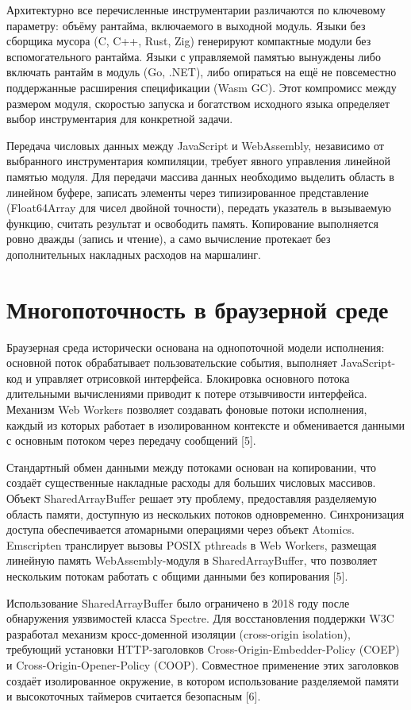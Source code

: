 \documentclass[12pt, oneside]{book}
\begin{document}
    \quad Архитектурно все перечисленные инструментарии различаются по ключевому параметру: объёму рантайма, включаемого в выходной модуль. Языки без сборщика мусора (C, C++, Rust, Zig) генерируют компактные модули без вспомогательного рантайма. Языки с управляемой памятью вынуждены либо включать рантайм в модуль (Go, .NET), либо опираться на ещё не повсеместно поддержанные расширения спецификации (Wasm GC). Этот компромисс между размером модуля, скоростью запуска и богатством исходного языка определяет выбор инструментария для конкретной задачи.
    
    \quad Передача числовых данных между JavaScript и WebAssembly, независимо от выбранного инструментария компиляции, требует явного управления линейной памятью модуля. Для передачи массива данных необходимо выделить область в линейном буфере, записать элементы через типизированное представление (Float64Array для чисел двойной точности), передать указатель в вызываемую функцию, считать результат и освободить память. Копирование выполняется ровно дважды (запись и чтение), а само вычисление протекает без дополнительных накладных расходов на маршалинг.

\section{Многопоточность в браузерной среде}

    \quad Браузерная среда исторически основана на однопоточной модели исполнения: основной поток обрабатывает пользовательские события, выполняет JavaScript-код и управляет отрисовкой интерфейса. Блокировка основного потока длительными вычислениями приводит к потере отзывчивости интерфейса. Механизм Web Workers позволяет создавать фоновые потоки исполнения, каждый из которых работает в изолированном контексте и обменивается данными с основным потоком через передачу сообщений [5].

    \quad Стандартный обмен данными между потоками основан на копировании, что создаёт существенные накладные расходы для больших числовых массивов. Объект SharedArrayBuffer решает эту проблему, предоставляя разделяемую область памяти, доступную из нескольких потоков одновременно. Синхронизация доступа обеспечивается атомарными операциями через объект Atomics. Emscripten транслирует вызовы POSIX pthreads в Web Workers, размещая линейную память WebAssembly-модуля в SharedArrayBuffer, что позволяет нескольким потокам работать с общими данными без копирования [5].

    \quad Использование SharedArrayBuffer было ограничено в 2018 году после обнаружения уязвимостей класса Spectre. Для восстановления поддержки W3C разработал механизм кросс-доменной изоляции (cross-origin isolation), требующий установки HTTP-заголовков Cross-Origin-Embedder-Policy (COEP) и Cross-Origin-Opener-Policy (COOP). Совместное применение этих заголовков создаёт изолированное окружение, в котором использование разделяемой памяти и высокоточных таймеров считается безопасным [6].
\end{document}
